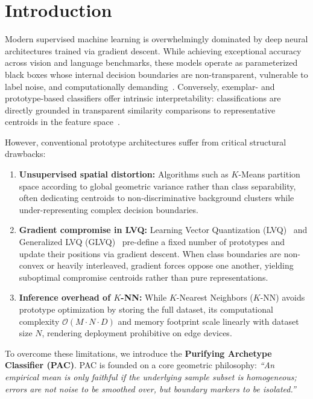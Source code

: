 \documentclass[11pt,a4paper]{article}
\begin{document}
\section{Introduction}
\label{sec:intro}

Modern supervised machine learning is overwhelmingly dominated by deep neural architectures trained via gradient descent. While achieving exceptional accuracy across vision and language benchmarks, these models operate as parameterized black boxes whose internal decision boundaries are non-transparent, vulnerable to label noise, and computationally demanding~\citep{chen2019looks, northcutt2021confident}. Conversely, exemplar- and prototype-based classifiers offer intrinsic interpretability: classifications are directly grounded in transparent similarity comparisons to representative centroids in the feature space~\citep{kohonen1990self, snell2017prototypical}.

However, conventional prototype architectures suffer from critical structural drawbacks:
\begin{enumerate}
    \item \textbf{Unsupervised spatial distortion:} Algorithms such as $K$-Means partition space according to global geometric variance rather than class separability, often dedicating centroids to non-discriminative background clusters while under-representing complex decision boundaries.
    \item \textbf{Gradient compromise in LVQ:} Learning Vector Quantization (LVQ)~\citep{kohonen1990self} and Generalized LVQ (GLVQ)~\citep{sato1996generalized} pre-define a fixed number of prototypes and update their positions via gradient descent. When class boundaries are non-convex or heavily interleaved, gradient forces oppose one another, yielding suboptimal compromise centroids rather than pure representations.
    \item \textbf{Inference overhead of $K$-NN:} While $K$-Nearest Neighbors ($K$-NN) avoids prototype optimization by storing the full dataset, its computational complexity $\mathcal{O}(M \cdot N \cdot D)$ and memory footprint scale linearly with dataset size $N$, rendering deployment prohibitive on edge devices.
\end{enumerate}

To overcome these limitations, we introduce the \textbf{Purifying Archetype Classifier (PAC)}. PAC is founded on a core geometric philosophy: \textit{``An empirical mean is only faithful if the underlying sample subset is homogeneous; errors are not noise to be smoothed over, but boundary markers to be isolated.''}
\end{document}
